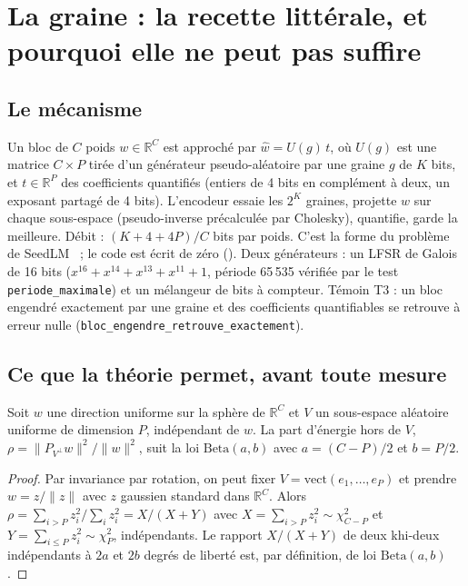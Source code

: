 \section{La graine : la recette littérale, et pourquoi elle ne peut pas suffire}\label{t3gen:sec:graine}

\subsection{Le mécanisme}

Un bloc de $C$ poids $w \in \mathbb{R}^C$ est approché par $\hat w = U(g)\,t$, où $U(g)$ est une matrice $C \times P$ tirée d'un générateur pseudo-aléatoire par une graine $g$ de $K$ bits, et $t \in \mathbb{R}^P$ des coefficients quantifiés (entiers de 4 bits en complément à deux, un exposant partagé de 4 bits). L'encodeur essaie les $2^K$ graines, projette $w$ sur chaque sous-espace (pseudo-inverse précalculée par Cholesky), quantifie, garde la meilleure. Débit : $(K + 4 + 4P)/C$ bits par poids. C'est la forme du problème de SeedLM~\cite{shafipour2024seedlm} ; le code est écrit de zéro (). Deux générateurs : un LFSR de Galois de 16 bits ($x^{16} + x^{14} + x^{13} + x^{11} + 1$, période 65\,535 vérifiée par le test \texttt{periode\_maximale}) et un mélangeur de bits à compteur. Témoin T3 : un bloc engendré exactement par une graine et des coefficients quantifiables se retrouve à erreur nulle (\texttt{bloc\_engendre\_retrouve\_exactement}).

\subsection{Ce que la théorie permet, avant toute mesure}

\begin{lemme}\label{t3gen:lem:beta}
Soit $w$ une direction uniforme sur la sphère de $\mathbb{R}^C$ et $V$ un sous-espace aléatoire uniforme de dimension $P$, indépendant de $w$. La part d'énergie hors de $V$, $\rho = \|P_{V^\perp} w\|^2 / \|w\|^2$, suit la loi $\mathrm{Beta}(a, b)$ avec $a = (C - P)/2$ et $b = P/2$.
\end{lemme}

\begin{proof}
Par invariance par rotation, on peut fixer $V = \mathrm{vect}(e_1, \ldots, e_P)$ et prendre $w = z / \|z\|$ avec $z$ gaussien standard dans $\mathbb{R}^C$. Alors $\rho = \sum_{i > P} z_i^2 / \sum_i z_i^2 = X/(X + Y)$ avec $X = \sum_{i>P} z_i^2 \sim \chi^2_{C-P}$ et $Y = \sum_{i \le P} z_i^2 \sim \chi^2_P$, indépendants. Le rapport $X/(X+Y)$ de deux khi-deux indépendants à $2a$ et $2b$ degrés de liberté est, par définition, de loi $\mathrm{Beta}(a, b)$.
\end{proof}

